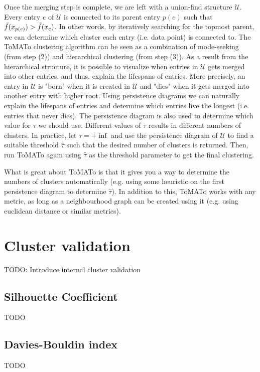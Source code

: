 Once the merging step is complete, we are left with a union-find structure $\mathcal{U}$. Every entry $e$ of $\mathcal{U}$ is connected to its parent entry $p(e)$ such that $\Tilde{f}(x_{p(e)}) > \Tilde{f}(x_e)$. In other words, by iteratively searching for the topmost parent, we can determine which cluster each entry (i.e. data point) is connected to. The ToMATo clustering algorithm can be seen as a combination of mode-seeking (from step (2)) and hierarchical clustering (from step (3)). As a result from the hierarchical structure, it is possible to visualize when entries in $\mathcal{U}$ gets merged into other entries, and thus, explain the lifespans of entries. More precisely, an entry in $\mathcal{U}$ is "born" when it is created in $\mathcal{U}$ and "dies" when it gets merged into another entry with higher root. Using persistence diagrams we can naturally explain the lifespans of entries and determine which entries live the longest (i.e. entries that never dies). The persistence diagram is also used to determine which value for $\tau$ we should use. Different values of $\tau$ results in different numbers of clusters. In practice, let $\tau = +\inf$ and use the persistence diagram of $\mathcal{U}$ to find a suitable threshold $\hat{\tau}$ such that the desired number of clusters is returned. Then, run ToMATo again using $\hat{\tau}$ as the threshold parameter to get the final clustering.

What is great about ToMATo is that it gives you a way to determine the numbers of clusters automatically (e.g. using some heuristic on the first persistence diagram to determine $\hat{\tau}$). In addition to this, ToMATo works with any metric, as long as a neighbourhood graph can be created using it (e.g. using euclidean distance or similar metrics).

\section{Cluster validation}
TODO: Introduce internal cluster validation

\subsection{Silhouette Coefficient}
TODO

\subsection{Davies-Bouldin index}
TODO

